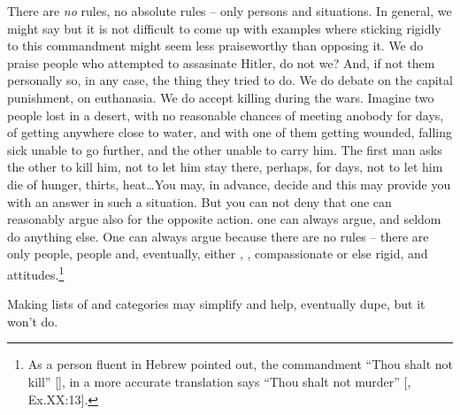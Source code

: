 {{%


\pa There are {\em no} rules, no absolute rules -- only persons and
 situations.  In general, we might say  but it is not difficult to come up with examples where sticking
rigidly to this commandment might seem less praiseworthy than opposing
it.  We do praise people who attempted to assasinate Hitler, do not
we?  And, if not them personally so, in any case, the thing they tried
to do.  We do debate on the capital punishment, on euthanasia. We do 
accept killing during the wars. 
Imagine two people lost in a desert, with no reasonable chances of
meeting anobody for days, of getting anywhere close to water, and with
one of them getting wounded, falling sick unable to go further, and
the other unable to carry him.  The first man asks the other to kill
him, not to let him stay there, perhaps, for days, not to let him die
of hunger, thirts, heat\ldots You may, in advance, decide  and this may provide you with an
answer in such a situation.  But you can not deny that one can
reasonably argue also for the opposite action.   one 
can always argue, and seldom do anything else. One can always argue because
there are no rules -- there are only people,  people and,
eventually, either , , compassionate or else
rigid,  and  attitudes.\footnote{As a person 
fluent in Hebrew pointed out, the  
commandment ``Thou shalt not kill'' [],  
in a more accurate translation says ``Thou shalt not murder'' 
[, Ex.XX:13].}

Making lists of  and categories may simplify and 
help, eventually dupe, but it won't do.

}}
